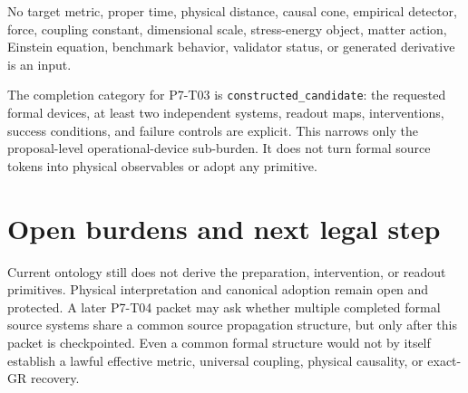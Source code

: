 \documentclass[11pt]{article}
\begin{document}
No target metric, proper time, physical distance, causal cone, empirical
detector, force, coupling constant, dimensional scale, stress-energy object,
matter action, Einstein equation, benchmark behavior, validator status, or
generated derivative is an input.

The completion category for P7-T03 is
\texttt{constructed\_candidate}: the requested formal devices, at least two
independent systems, readout maps, interventions, success conditions, and
failure controls are explicit. This narrows only the proposal-level
operational-device sub-burden. It does not turn formal source tokens into
physical observables or adopt any primitive.

\section{Open burdens and next legal step}

Current ontology still does not derive the preparation, intervention, or
readout primitives. Physical interpretation and canonical adoption remain
open and protected. A later P7-T04 packet may ask whether multiple completed
formal source systems share a common source propagation structure, but only
after this packet is checkpointed. Even a common formal structure would not
by itself establish a lawful effective metric, universal coupling, physical
causality, or exact-GR recovery.
\end{document}
